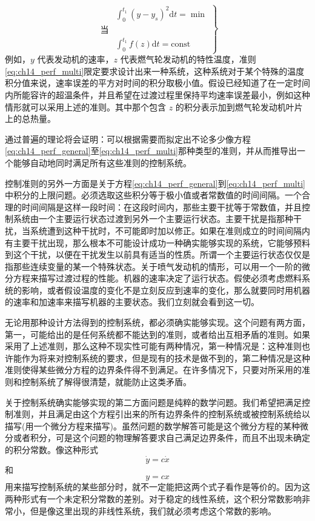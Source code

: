 \begin{equation}
\left.
\begin{aligned}
&\int_{0}^{t_1} (y - y_s)^2 \mathrm{d}t = \min \\
\mbox{当}&\\
&\int_{0}^{t_1} f(z) \mathrm{d}t = \mathrm{const}
\end{aligned}
\right\}
\label{eq:ch14_perf_multi}
\end{equation}
例如，$y$ 代表发动机的速率，$z$ 代表燃气轮发动机的特性温度，准则\eqref{eq:ch14_perf_multi}限定要求设计出来一种系统，这种系统对于某个特殊的温度积分值来说，速率误差的平方对时间的积分取极小值。假设已经知道了在一定时间内所能容许的超温条件，并且希望在过渡过程里保持平均速率误差最小，例如这种情形就可以采用上述的准则。其中那个包含 $z$ 的积分表示加到燃气轮发动机叶片上的总热量。

通过普遍的理论将会证明：可以根据需要而拟定出不论多少像方程\eqref{eq:ch14_perf_general}至\eqref{eq:ch14_perf_multi}那种类型的准则，并从而推导出一个能够自动地同时满足所有这些准则的控制系统。

控制准则的另外一方面是关于方程\eqref{eq:ch14_perf_general}到\eqref{eq:ch14_perf_multi}中积分的上限问题。必须选取这些积分等于极小值或者常数值的时间间隔。一个合理的时间间隔是这样一段时间：在这段时间内，那些主要干扰等于常数值，并且控制系统由一个主要运行状态过渡到另外一个主要运行状态。主要干扰是指那种干扰，当系统遭到这种干扰时，不可能即时加以修正。如果在准则成立的时间间隔内有主要干扰出现，那么根本不可能设计成功一种确实能够实现的系统，它能够预料到这个干扰，以便在干扰发生以前具有适当的性质。所谓一个主要运行状态仅仅是指那些连续变量的某一个特殊状态。关于喷气发动机的情形，可以用一个一阶的微分方程来描写过渡过程的性能。机器的速率决定了运行状态。假使必须考虑燃料系统的影响，或者假设温度的变化不是立刻反应到速率的变化，那么就要同时用机器的速率和加速率来描写机器的主要状态。我们立刻就会看到这一切。

无论用那种设计方法得到的控制系统，都必须确实能够实现。这个问题有两方面，第一，可能给出的是任何系统都不能达到的准则，或者给出互相矛盾的准则。如果采用了上述准则，那么这种不现实性可能有两种情况，第一种情况是：这种准则也许能作为将来对控制系统的要求，但是现有的技术是做不到的，第二种情况是这种准则使得某些微分方程的边界条件得不到满足。在许多情况下，只要对所采用的准则和控制系统了解得很清楚，就能防止这类矛盾。

关于控制系统确实能够实现的第二方面问题是纯粹的数学问题。我们希望把满足控制准则，并且满足由这个方程引出来的所有边界条件的控制系统或被控制系统给以描写(用一个微分方程来描写)。虽然问题的数学解答可能是这个微分方程的某种微分或者积分，可是这个问题的物理解答要求自己满足边界条件，而且不出现未确定的积分常数。像这种形式
\begin{equation*}
\dot{y} = c \dot{x}
\end{equation*}
和
\begin{equation*}
y = c x
\end{equation*}
用来描写控制系统的某些部分时，就不一定能把这两个式子看作是等价的。因为这两种形式有一个未定积分常数的差别。对于稳定的线性系统，这个积分常数影响非常小，但是像这里出现的非线性系统，我们就必须考虑这个常数的影响。

